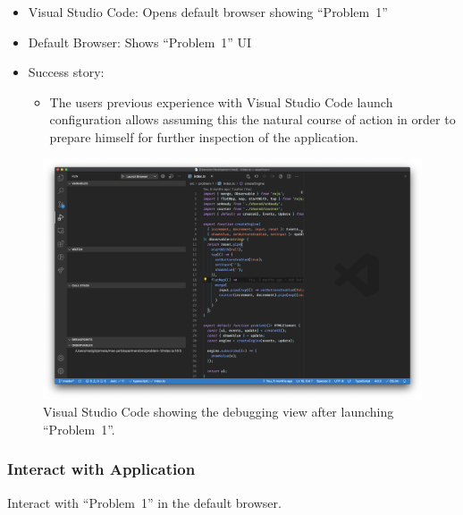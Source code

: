 \documentclass[sigplan,screen,nonacm,review]{acmart}
\begin{document}
\begin{itemize}
	\item Visual Studio Code: Opens default browser showing ``Problem~1''
	\item Default Browser: Shows ``Problem~1'' UI
	\item Success story:
	      \begin{itemize}
	      	\item The users previous experience with Visual Studio Code launch configuration allows assuming this the natural course of action in order to prepare himself for further inspection of the application.
	      \end{itemize}
\end{itemize}

\begin{figure}[ht]
	\centering
	\includegraphics[width=\columnwidth]{walkthrough-screenshots/step6.png}
	\Description{}
	\caption{Visual Studio Code showing the debugging view after launching ``Problem~1''.}
	\label{fig:walkthrough-screesnhot-step-6}
\end{figure}

\subsubsection{Interact with Application}
Interact with ``Problem~1'' in the default browser.
\end{document}
